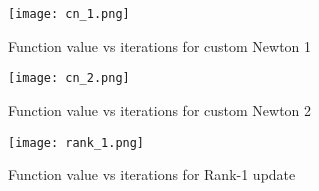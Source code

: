 \documentclass[12pt,a4paper]{article}
\theoremstyle{remark}
\begin{document}
\begin{enumerate}
    \begin{figure}
        \centering
        \texttt{[image: cn\_1.png]}
        \caption{Function value vs iterations for custom Newton 1}
        \label{fig:custom_Newton_1}
    \end{figure}

    \begin{figure}
        \centering
        \texttt{[image: cn\_2.png]}
        \caption{Function value vs iterations for custom Newton 2}
        \label{fig:custom_Newton_2}
    \end{figure}

    \begin{figure}
        \centering
        \texttt{[image: rank\_1.png]}
        \caption{Function value vs iterations for Rank-1 update}
        \label{fig:rank_1_update}
    \end{figure}

\end{enumerate}
\end{document}
